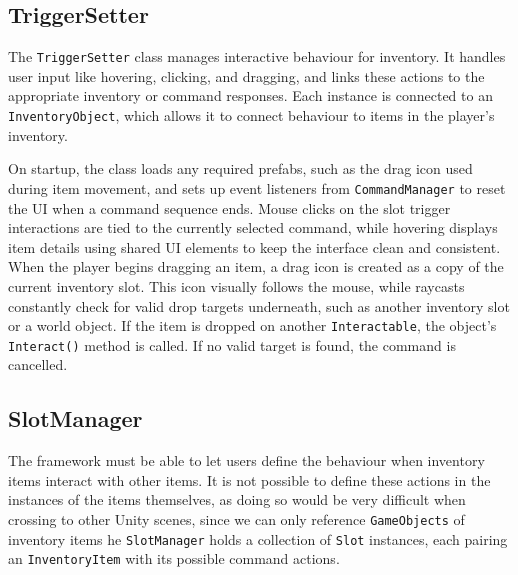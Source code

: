 
\subsection{TriggerSetter}
The \verb|TriggerSetter| class manages interactive behaviour for inventory. It handles user input like hovering, clicking, and dragging, and links these actions to the appropriate inventory or command responses. Each instance is connected to an \verb|InventoryObject|, which allows it to connect behaviour to items in the player's inventory.

On startup, the class loads any required prefabs, such as the drag icon used during item movement, and sets up event listeners from \verb|CommandManager| to reset the UI when a command sequence ends. Mouse clicks on the slot trigger interactions are tied to the currently selected command, while hovering displays item details using shared UI elements to keep the interface clean and consistent. When the player begins dragging an item, a drag icon is created as a copy of the current inventory slot. This icon visually follows the mouse, while raycasts constantly check for valid drop targets underneath, such as another inventory slot or a world object. If the item is dropped on another \verb|Interactable|, the object’s \verb|Interact()| method is called. If no valid target is found, the command is cancelled.

\subsection{SlotManager}
The framework must be able to let users define the behaviour when inventory items interact with other items. It is not possible to define these actions in the instances of the items themselves, as doing so would be very difficult when crossing to other Unity scenes, since we can only reference \verb|GameObjects| of inventory items he \verb|SlotManager| holds a collection of \verb|Slot| instances, each pairing an \verb|InventoryItem| with its possible command actions.

